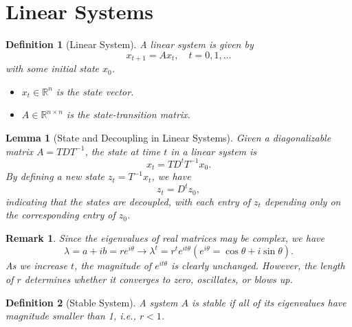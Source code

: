 \documentclass[a4 paper]{article}
\numberwithin{equation}{section}
\theoremstyle{boldStyle}
\newtheorem{remark}{Remark}[section]
\theoremstyle{boldBlueStyle}
\newtheorem{lemma}{Lemma}[section]
\theoremstyle{boldPurpleStyle}
\theoremstyle{boldRedStyle}
\newtheorem{definition}{Definition}[section]
\begin{document}
\section{Linear Systems}

\begin{definition}[Linear System]
  A linear system is given by
  \begin{equation}
      x_{t+1} = A x_t, \quad t = 0, 1, \ldots
  \end{equation}
  with some initial state \( x_0 \).

  \begin{itemize}
      \item \( x_t \in \mathbb{R}^n \) is the state vector.
      \item \( A \in \mathbb{R}^{n \times n} \) is the state-transition matrix.
  \end{itemize}
\end{definition}

\begin{lemma}[State and Decoupling in Linear Systems]
  Given a diagonalizable matrix \( A = TDT^{-1} \), the state at time \( t \) in a linear system is
  \begin{equation}
      x_t = T D^t T^{-1} x_0.
  \end{equation}
  By defining a new state \( z_t = T^{-1} x_t \), we have
  \begin{equation}
      z_t = D^t z_0,
  \end{equation}
  indicating that the states are decoupled, with each entry of \( z_t \) depending only on the corresponding entry of \( z_0 \).
\end{lemma}

\begin{remark}
  Since the eigenvalues of real matrices may be complex, we have
  \[
  \lambda = a + ib = re^{i\theta} \rightarrow \lambda^t = r^t e^{it\theta} (e^{i\theta} = \cos \theta + i \sin \theta).
  \]
  As we increase \( t \), the magnitude of \( e^{it\theta} \) is clearly unchanged. However, the length of \( r \) determines whether it converges to zero, oscillates, or blows up.
\end{remark}

\begin{definition}[Stable System]
  A system \( A \) is \textit{stable} if all of its eigenvalues have magnitude smaller than 1, i.e., \( r < 1 \).
\end{definition}
\end{document}
